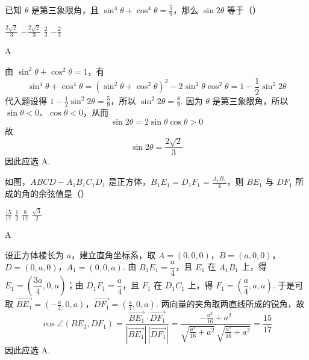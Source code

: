 \documentclass[UTF8,a4paper,oneside,11pt]{ctexbook}
\begin{document}
\begin{problem}
已知 \(\theta\) 是第三象限角，且 \(\sin^4\theta + \cos^4\theta = \frac{5}{9}\)，那么 \(\sin 2\theta\) 等于（\quad）

\choices
    {\(\frac{2\sqrt{2}}{3}\)}
    {\(-\frac{2\sqrt{2}}{3}\)}
    {\(\frac{2}{3} \)}
    {\(-\frac{2}{3}\)}
\end{problem}

\begin{answer}
A
\end{answer}

\begin{solution}
由 \(\sin^2\theta+\cos^2\theta=1\)，有
\[
\sin^4\theta+\cos^4\theta
 =\left(\sin^2\theta+\cos^2\theta\right)^2-2\sin^2\theta\cos^2\theta
 =1-\frac12\sin^2 2\theta
\]
代入题设得 \(1-\frac12\sin^2 2\theta=\frac59\)，所以 \(\sin^2 2\theta=\frac89\).
因为 \(\theta\) 是第三象限角，所以 \(\sin\theta<0\)、\(\cos\theta<0\)，从而
\[
\sin2\theta=2\sin\theta\cos\theta>0
\]
故
\[
\sin2\theta=\frac{2\sqrt2}{3}
\]
因此应选 A.
\end{solution}

\begin{problem}
如图，\(ABCD - A_{1}B_{1}C_{1}D_{1}\) 是正方体，\(B_{1}E_{1} = D_{1}F_{1} = \frac{A_{1}B_{1}}{4}\)，则 \(BE_{1}\) 与 \(DF_{1}\) 所成的角的余弦值是（\quad）


\choices
    {\(\frac{15}{17}\)}
    {\(\frac{1}{2}\)}
    {\(\frac{8}{17}\)}
    {\(\frac{\sqrt{3}}{2}\)}
\end{problem}

\begin{answer}
A
\end{answer}

\begin{solution}
设正方体棱长为 \(a\)，建立直角坐标系，取 \(A=(0,0,0)\)，\(B=(a,0,0)\)，\(D=(0,a,0)\)，\(A_1=(0,0,a)\).
由 \(B_1E_1=\dfrac{a}{4}\)，且 \(E_1\) 在 \(A_1B_1\) 上，得 \(E_1=\left(\dfrac{3a}{4},0,a\right)\)；由 \(D_1F_1=\dfrac{a}{4}\)，且 \(F_1\) 在 \(D_1C_1\) 上，得 \(F_1=\left(\dfrac{a}{4},a,a\right)\). 于是可取 \(\overrightarrow{BE_1}=\left(-\frac a4,0,a\right)\)，\(\overrightarrow{DF_1}=\left(\frac a4,0,a\right)\).
两向量的夹角取两直线所成的锐角，故
\[
\cos\angle\left(BE_1,DF_1\right)
=\frac{\overrightarrow{BE_1}\cdot\overrightarrow{DF_1}}
{|\overrightarrow{BE_1}|\,|\overrightarrow{DF_1}|}
=\frac{-\frac{a^2}{16}+a^2}
{\sqrt{\frac{a^2}{16}+a^2}\,\sqrt{\frac{a^2}{16}+a^2}}
=\frac{15}{17}
\]
因此应选 A.
\end{solution}
\end{document}
